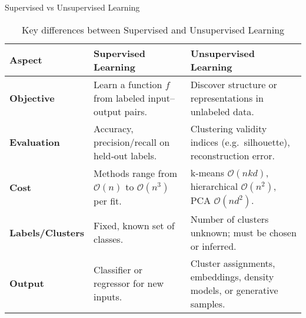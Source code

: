 \begin{frame}[fragile]{Supervised vs Unsupervised Learning}
  \scriptsize  %
  \begin{table}[h!]
    \centering
    \begin{tabular}{|p{2cm}|p{3cm}|p{3cm}|}
      \hline
      \textbf{Aspect}        & \textbf{Supervised Learning}                                              & \textbf{Unsupervised Learning}                                                                  \\
      \hline
      \textbf{Objective}     & Learn a function \(f\) from labeled input–output pairs.                  & Discover structure or representations in unlabeled data.                                          \\
      \hline
      \textbf{Evaluation}    & Accuracy, precision/recall on held‑out labels.                           & Clustering validity indices (e.g.\ silhouette), reconstruction error.                             \\
      \hline
      \textbf{Cost}          & Methods range from \(\mathcal O(n)\) to \(\mathcal O(n^3)\) per fit.     & k‑means \(\mathcal O(nkd)\), hierarchical \(\mathcal O(n^2)\), PCA \(\mathcal O(nd^2)\).         \\
      \hline
      \textbf{Labels/Clusters} & Fixed, known set of classes.                                           & Number of clusters unknown; must be chosen or inferred.                                           \\
      \hline
      \textbf{Output}        & Classifier or regressor for new inputs.                                  & Cluster assignments, embeddings, density models, or generative samples.                           \\
      \hline
    \end{tabular}
    \caption{Key differences between Supervised and Unsupervised Learning}
  \end{table}
\end{frame}

